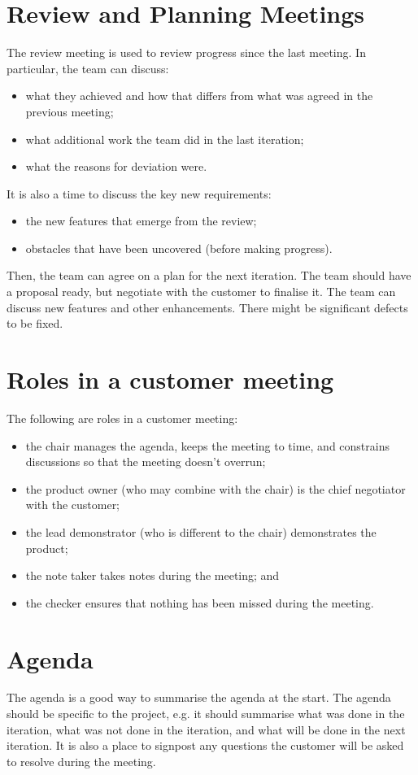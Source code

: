 \documentclass[a4paper, openany]{memoir}
\begin{document}
\section{Review and Planning Meetings}
The review meeting is used to review progress since the last meeting. In particular, the team can discuss:
\begin{itemize}
    \item what they achieved and how that differs from what was agreed in the previous meeting;
    \item what additional work the team did in the last iteration;
    \item what the reasons for deviation were.
\end{itemize}
It is also a time to discuss the key new requirements:
\begin{itemize}
    \item the new features that emerge from the review;
    \item obstacles that have been uncovered (before making progress).
\end{itemize}
Then, the team can agree on a plan for the next iteration. The team should have a proposal ready, but negotiate with the customer to finalise it. The team can discuss new features and other enhancements. There might be significant defects to be fixed.

\section{Roles in a customer meeting}
The following are roles in a customer meeting:
\begin{itemize}
    \item the chair manages the agenda, keeps the meeting to time, and constrains discussions so that the meeting doesn't overrun;
    \item the product owner (who may combine with the chair) is the chief negotiator with the customer; 
    \item the lead demonstrator (who is different to the chair) demonstrates the product;
    \item the note taker takes notes during the meeting; and
    \item the checker ensures that nothing has been missed during the meeting.
\end{itemize}

\section{Agenda}
The agenda is a good way to summarise the agenda at the start. The agenda should be specific to the project, e.g. it should summarise what was done in the iteration, what was not done in the iteration, and what will be done in the next iteration. It is also a place to signpost any questions the customer will be asked to resolve during the meeting.
\end{document}
